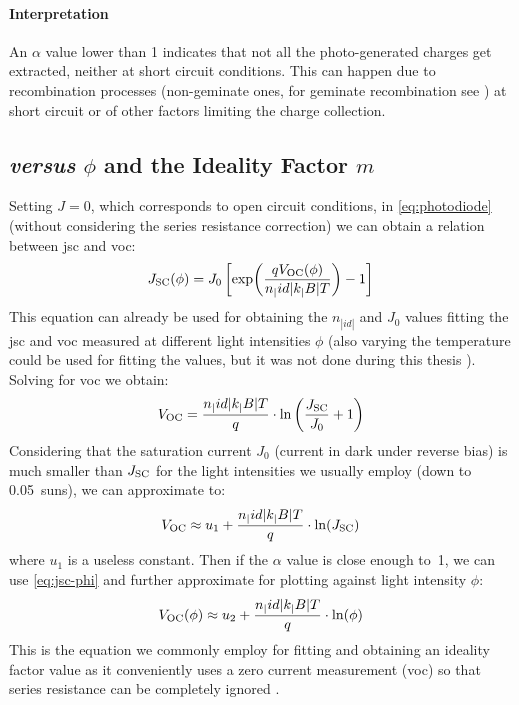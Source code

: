 		\paragraph{Interpretation} 
		An $\alpha$ value lower than 1 indicates that not all the photo-generated charges get extracted, neither at short circuit conditions.
		This can happen due to recombination processes (non-geminate ones, for geminate recombination see ) at short circuit \cite{Credgington2011} or of other factors limiting the charge collection. 

	\subsection{ \textsl{versus} $\phi$ and the Ideality Factor $m$}
		Setting $J=0$, which corresponds to open circuit conditions, in \cref{eq:photodiode} (without considering the series resistance correction) we can obtain a relation between \gls{jsc} and \gls{voc}:
		\begin{equation}
		J_\mathrm{SC}(\phi) = J_0\left[\exp(\frac{qV_\mathrm{OC} (\phi)}{n_|id|k_|B|T})-1\right]
		\end{equation}
		This equation can already be used for obtaining the $n_|id|$ and $J_0$ values fitting the \gls{jsc} and \gls{voc} measured at different light intensities $\phi$ (also varying the temperature could be used for fitting the values, but it was not done during this thesis \cite{Tvingstedt2016}).
		Solving for \gls{voc} we obtain:
		\begin{equation}V_\mathrm{OC} = \frac{n_|id|k_|B|T}{q}\cdot\ln\left(\frac{J_\mathrm{SC}}{J_0} + 1\right)\end{equation}
		Considering that the saturation current $J_0$ (current in dark under reverse bias) is much smaller than $J_\mathrm{SC}$ for the light intensities we usually employ (down to \SI{0.05}{suns}), we can approximate to:
		\begin{equation}
		V_\mathrm{OC} \approx u_1 + \frac{n_|id|k_|B|T}{q}\cdot\ln(J_\mathrm{SC})
		\end{equation}
		where $u_1$ is a useless constant.
		Then if the $\alpha$ value is close enough to~1, we can use \cref{eq:jsc-phi} and further approximate for plotting against light intensity $\phi$:
		\begin{equation}\label{eq:voc_vs_phi}
			V_\mathrm{OC} (\phi) \approx u_2 + \frac{n_|id|k_|B|T}{q}\cdot\ln(\phi)
		\end{equation}
		This is the equation we commonly employ for fitting and obtaining an ideality factor value \cite{Nelson2003} as it conveniently uses a zero current measurement (\gls{voc}) so that series resistance can be completely ignored \cite{Kirchartz2012}.
